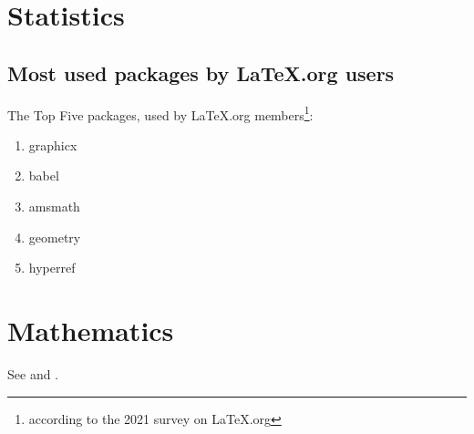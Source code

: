 \documentclass{book}
\begin{document}
\chapter{Statistics}
\label{stats}
\section{Most used packages by LaTeX.org users}
\label{packages}
The Top Five packages, used by LaTeX.org
members\footnote{according to the 2021 survey on
LaTeX.org\label{project}}:
\begin{enumerate}
  \item graphicx\label{graphicx}
  \item babel
  \item amsmath\label{amsmath}
  \item geometry
  \item hyperref
\end{enumerate}
\chapter{Mathematics}
\label{maths}
See  and .
\end{document}
